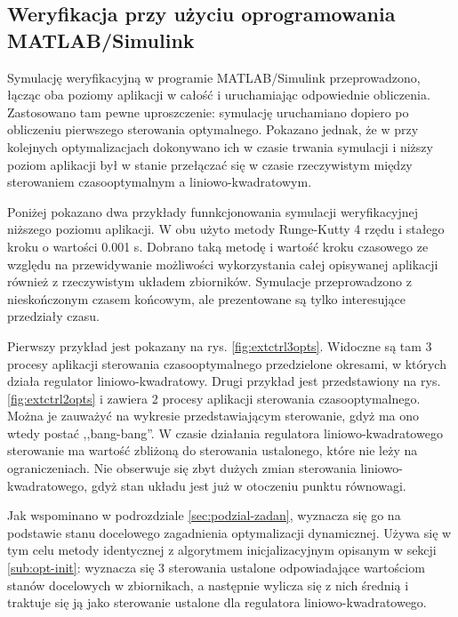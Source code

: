 \subsection{Weryfikacja przy użyciu oprogramowania MATLAB/Simulink}
\label{sub:sym-wer-matlab}


Symulację weryfikacyjną w programie MATLAB/Simulink przeprowadzono, łącząc oba poziomy aplikacji w całość i uruchamiając odpowiednie obliczenia. Zastosowano tam pewne uproszczenie: symulację uruchamiano dopiero po obliczeniu pierwszego sterowania optymalnego. Pokazano jednak, że w przy kolejnych optymalizacjach dokonywano ich w czasie trwania symulacji i niższy poziom aplikacji był w stanie przełączać się w czasie rzeczywistym między sterowaniem czasooptymalnym a liniowo-kwadratowym.

Poniżej pokazano dwa przykłady funnkcjonowania symulacji weryfikacyjnej niższego poziomu aplikacji.
W obu użyto metody Runge-Kutty 4 rzędu i stałego kroku o wartości 0.001 s. Dobrano taką metodę i wartość kroku czasowego ze względu na przewidywanie możliwości wykorzystania całej opisywanej aplikacji również z rzeczywistym układem zbiorników.
Symulacje przeprowadzono z nieskończonym czasem końcowym, ale prezentowane są tylko interesujące przedziały czasu.

Pierwszy przykład jest pokazany na rys. \ref{fig:extctrl3opts}. Widoczne są tam 3 procesy aplikacji sterowania czasooptymalnego przedzielone okresami, w których działa regulator liniowo-kwadratowy.
Drugi przykład jest przedstawiony na rys. \ref{fig:extctrl2opts} i zawiera 2 procesy aplikacji sterowania czasooptymalnego.
Można je zauważyć na wykresie przedstawiającym sterowanie, gdyż ma ono wtedy postać ,,bang-bang''. W czasie działania regulatora liniowo-kwadratowego sterowanie ma wartość zbliżoną do sterowania ustalonego, które nie leży na ograniczeniach. Nie obserwuje się zbyt dużych zmian sterowania liniowo-kwadratowego, gdyż stan układu jest już w otoczeniu punktu równowagi.

Jak wspominano w podrozdziale \ref{sec:podzial-zadan}, wyznacza się go na podstawie stanu docelowego zagadnienia optymalizacji dynamicznej. Używa się w tym celu metody identycznej z algorytmem inicjalizacyjnym opisanym w sekcji \ref{sub:opt-init}: wyznacza się 3 sterowania ustalone odpowiadające wartościom stanów docelowych w zbiornikach, a następnie wylicza się z nich średnią i traktuje się ją jako sterowanie ustalone dla regulatora liniowo-kwadratowego.

